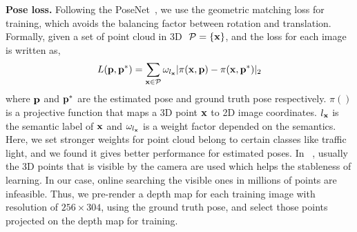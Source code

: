 \textbf{Pose loss.}
Following the PoseNet~\cite{kendall2017geometric}, we use the geometric matching loss for training, which avoids the balancing factor between rotation and translation.
Formally, given a set of point cloud in 3D $~{\mathcal P}=\{{\mathbf x}\}$, and the loss for each image is written as,
\begin{align}
L({\mathbf p}, {\mathbf p}^*) = \sum_{{\mathbf x} \in {\mathcal P}}\omega_{l_{\mathbf x}}|\pi({\mathbf x}, {\mathbf p}) - \pi({\mathbf x}, {\mathbf p}^*)|_2
\label{eq:proj_loss}
\end{align}
where ${\mathbf p}$ and ${\mathbf p}^*$ are the estimated pose and ground truth pose respectively. $\pi()$ is a projective function that maps a 3D point ${\mathbf x}$ to 2D image coordinates. $l_{\mathbf x}$ is the semantic label of ${\mathbf x}$ and $\omega_{l_{\mathbf x}}$ is a weight factor depended on the semantics. Here, we set stronger weights for point cloud belong to certain classes like traffic light, and we found it gives better performance for estimated poses.
In ~\cite{kendall2017geometric}, usually the 3D points that is visible by the camera are used which helps the stableness of learning. In our case, online searching the visible ones in millions of points are infeasible.
Thus, we pre-render a depth map for each training image with resolution of $256 \times 304$, using the ground truth pose, and select those points projected on the depth map for training.

